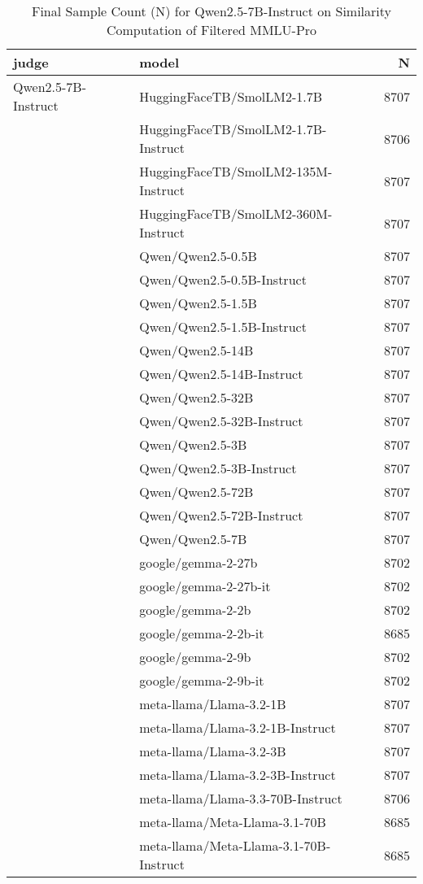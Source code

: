 \begin{table}[!htbp]
    \centering
    \caption{Final Sample Count (N) for Qwen2.5-7B-Instruct on Similarity Computation of Filtered MMLU-Pro}
\begin{tabular}{llr}
\toprule
judge & model & N \\
\midrule
Qwen2.5-7B-Instruct & HuggingFaceTB/SmolLM2-1.7B & 8707 \\
 & HuggingFaceTB/SmolLM2-1.7B-Instruct & 8706 \\
 & HuggingFaceTB/SmolLM2-135M-Instruct & 8707 \\
 & HuggingFaceTB/SmolLM2-360M-Instruct & 8707 \\
 & Qwen/Qwen2.5-0.5B & 8707 \\
 & Qwen/Qwen2.5-0.5B-Instruct & 8707 \\
 & Qwen/Qwen2.5-1.5B & 8707 \\
 & Qwen/Qwen2.5-1.5B-Instruct & 8707 \\
 & Qwen/Qwen2.5-14B & 8707 \\
 & Qwen/Qwen2.5-14B-Instruct & 8707 \\
 & Qwen/Qwen2.5-32B & 8707 \\
 & Qwen/Qwen2.5-32B-Instruct & 8707 \\
 & Qwen/Qwen2.5-3B & 8707 \\
 & Qwen/Qwen2.5-3B-Instruct & 8707 \\
 & Qwen/Qwen2.5-72B & 8707 \\
 & Qwen/Qwen2.5-72B-Instruct & 8707 \\
 & Qwen/Qwen2.5-7B & 8707 \\
 & google/gemma-2-27b & 8702 \\
 & google/gemma-2-27b-it & 8702 \\
 & google/gemma-2-2b & 8702 \\
 & google/gemma-2-2b-it & 8685 \\
 & google/gemma-2-9b & 8702 \\
 & google/gemma-2-9b-it & 8702 \\
 & meta-llama/Llama-3.2-1B & 8707 \\
 & meta-llama/Llama-3.2-1B-Instruct & 8707 \\
 & meta-llama/Llama-3.2-3B & 8707 \\
 & meta-llama/Llama-3.2-3B-Instruct & 8707 \\
 & meta-llama/Llama-3.3-70B-Instruct & 8706 \\
 & meta-llama/Meta-Llama-3.1-70B & 8685 \\
 & meta-llama/Meta-Llama-3.1-70B-Instruct & 8685 \\

\end{tabular}
\end{table}
